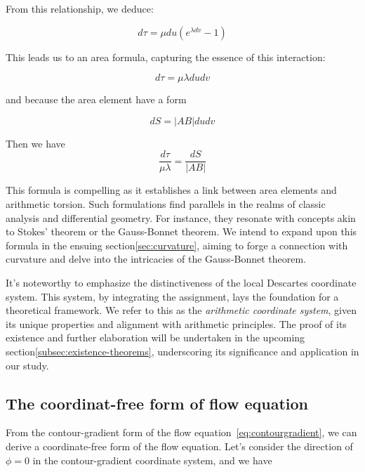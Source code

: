 From this relationship, we deduce:

\begin{equation}
    d\tau = \mu du (e^{\lambda dv} - 1)
\end{equation}

This leads us to an area formula, capturing the essence of this interaction:

\begin{equation}
    d\tau = \mu \lambda du dv \label{eq:area_formula}
\end{equation}

and because the area element have a form

\begin{equation}
    dS = |AB| du dv \label{eq:area_element}
\end{equation}

Then we have
\begin{equation}
    \frac{d\tau}{\mu \lambda} = \frac{dS}{|AB|}\label{eq:area_formula2}
\end{equation}

This formula is compelling as it establishes a link between area elements and arithmetic torsion.
Such formulations find parallels in the realms of classic analysis and differential geometry.
For instance, they resonate with concepts akin to Stokes' theorem or the Gauss-Bonnet theorem.
We intend to expand upon this formula in the ensuing section\ref{sec:curvature},
aiming to forge a connection with curvature and delve into the intricacies of the Gauss-Bonnet theorem.

It's noteworthy to emphasize the distinctiveness of the local Descartes coordinate system.
This system, by integrating the assignment, lays the foundation for a theoretical framework.
We refer to this as the \emph{arithmetic coordinate system}, given its unique properties and alignment with arithmetic principles.
The proof of its existence and further elaboration will be undertaken in the upcoming section\ref{subsec:existence-theorems},
underscoring its significance and application in our study.

\subsection{The coordinat-free form of flow equation}\label{subsec:coordinate-free}

From the contour-gradient form of the flow equation~\eqref{eq:contourgradient}, we can derive a coordinate-free form of the flow equation.
Let's consider the direction of \(\phi = 0\) in the contour-gradient coordinate system, and we have

